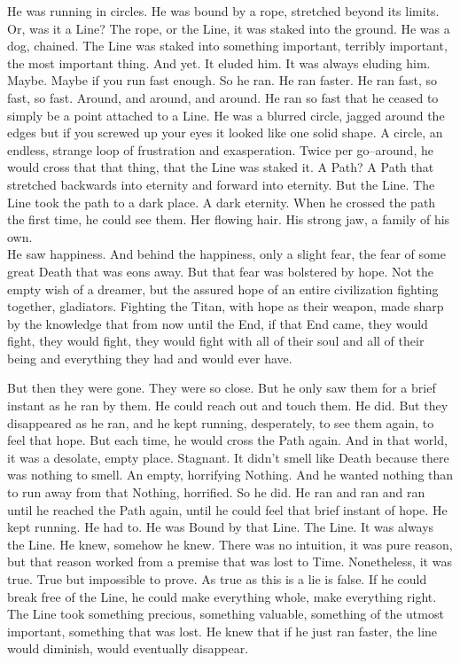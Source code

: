 He was running in circles. He was bound by a rope, stretched beyond its limits. Or, was it a Line? The rope, or the Line, it was staked into the ground. He was a dog, chained. The Line was staked into something important, terribly important, the most important thing. And yet. It eluded him. It was always eluding him.
\SmallVSpace
Maybe. Maybe if you run fast enough. So he ran. He ran faster. He ran fast, so fast, so fast. Around, and around, and around. He ran so fast that he ceased to simply be a point attached to a Line. He was a blurred circle, jagged around the edges but if you screwed up your eyes it looked like one solid shape. A circle, an endless, strange loop of frustration and exasperation. Twice per go\mbox{--}around, he would cross that{\el} that thing, that the Line was staked it. A Path? A Path that stretched backwards into eternity and forward into eternity. But the Line. The Line took the path to a dark place. A dark eternity.
\SmallVSpace
When he crossed the path the first time, he could see them. Her flowing hair. His strong jaw, a family of his own.\\He saw happiness. And behind the happiness, only a slight fear, the fear of some great Death that was eons away. But that fear was bolstered by hope. Not the empty wish of a dreamer, but the assured hope of an entire civilization fighting together, gladiators. Fighting the Titan, with hope as their weapon, made sharp by the knowledge that from now until the End, if that End came, they would fight, they would fight, they would fight with all of their soul and all of their being and everything they had and would ever have.

But then they were gone. They were so close. But he only saw them for a brief instant as he ran by them. He could reach out and touch them. He did. But they disappeared as he ran, and he kept running, desperately, to see them again, to feel that hope. But each time, he would cross the Path again. And in that world, it was a desolate, empty place. Stagnant. It didn’t smell like Death because there was nothing to smell. An empty, horrifying Nothing. And he wanted nothing than to run away from that Nothing, horrified.
\SmallVSpace
So he did.
\SmallVSpace
He ran and ran and ran until he reached the Path again, until he could feel that brief instant of hope. He kept running. He had to. He was Bound by that Line. The Line. It was always the Line. He knew, somehow he knew. There was no intuition, it was pure reason, but that reason worked from a premise that was lost to Time. Nonetheless, it was true. True but impossible to prove. As true as this is a lie is false. If he could break free of the Line, he could make everything whole, make everything right. The Line took something precious, something valuable, something of the utmost important, something that was lost. He knew that if he just ran faster, the line would diminish, would eventually disappear.

